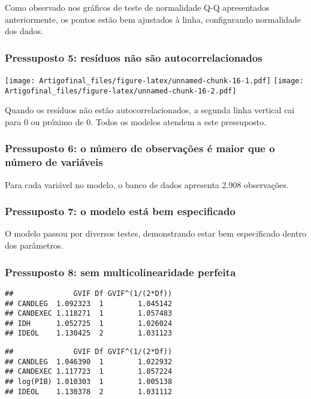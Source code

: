 \documentclass[]{article}
\begin{document}
Como observado nos gráficos de teste de normalidade Q-Q apresentados
anteriormente, os pontos estão bem ajustados à linha, configurando
normalidade dos dados.

\subsubsection{Pressuposto 5: resíduos não são
autocorrelacionados}\label{pressuposto-5-residuos-nao-sao-autocorrelacionados}

\texttt{[image: Artigofinal\_files/figure-latex/unnamed-chunk-16-1.pdf]}
\texttt{[image: Artigofinal\_files/figure-latex/unnamed-chunk-16-2.pdf]}

Quando os resíduos não estão autocorrelacionados, a segunda linha
vertical cai para 0 ou próximo de 0. Todos os modelos atendem a este
pressuposto.

\subsubsection{Pressuposto 6: o número de observações é maior que o
número de
variáveis}\label{pressuposto-6-o-numero-de-observacoes-e-maior-que-o-numero-de-variaveis}

Para cada variável no modelo, o banco de dados apresenta 2.908
observações.

\subsubsection{Pressuposto 7: o modelo está bem
especificado}\label{pressuposto-7-o-modelo-esta-bem-especificado}

O modelo passou por diversos testes, demonstrando estar bem especificado
dentro dos parâmetros.

\subsubsection{Pressuposto 8: sem multicolinearidade
perfeita}\label{pressuposto-8-sem-multicolinearidade-perfeita}

\begin{verbatim}
##              GVIF Df GVIF^(1/(2*Df))
## CANDLEG  1.092323  1        1.045142
## CANDEXEC 1.118271  1        1.057483
## IDH      1.052725  1        1.026024
## IDEOL    1.130425  2        1.031123
\end{verbatim}

\begin{verbatim}
##              GVIF Df GVIF^(1/(2*Df))
## CANDLEG  1.046390  1        1.022932
## CANDEXEC 1.117723  1        1.057224
## log(PIB) 1.010303  1        1.005138
## IDEOL    1.130378  2        1.031112
\end{verbatim}
\end{document}
